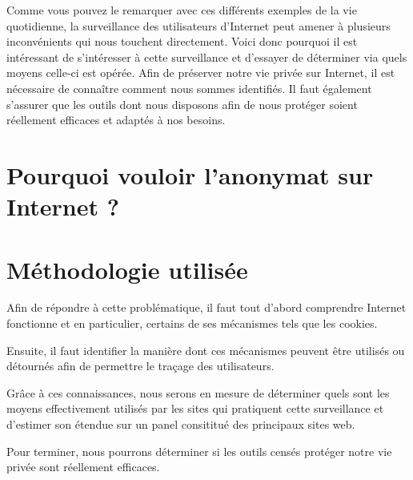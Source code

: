 Comme vous pouvez le remarquer avec ces différents exemples de la vie quotidienne, la surveillance des utilisateurs d'Internet peut amener à plusieurs inconvénients qui nous touchent directement. Voici donc pourquoi il est intéressant de s'intéresser à cette surveillance et d'essayer de déterminer via quels moyens celle-ci est opérée. Afin de préserver notre vie privée sur Internet, il est nécessaire de connaître comment nous sommes identifiés. Il faut également s'assurer que les outils dont nous disposons afin de nous protéger soient réellement efficaces et adaptés à nos besoins.

\section{Pourquoi vouloir l'anonymat sur Internet ?}

\section{Méthodologie utilisée}
Afin de répondre à cette problématique, il faut tout d'abord comprendre Internet fonctionne et en particulier, certains de ses mécanismes tels que les cookies.

Ensuite, il faut identifier la manière dont ces mécanismes peuvent être utilisés ou détournés afin de permettre le traçage des utilisateurs.

Grâce à ces connaissances, nous serons en mesure de déterminer quels sont les moyens effectivement utilisés par les sites qui pratiquent cette surveillance et d'estimer son étendue sur un panel consititué des principaux sites web.

Pour terminer, nous pourrons déterminer si les outils censés protéger notre vie privée sont réellement efficaces. %

